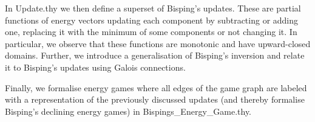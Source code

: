 In Update.thy we then define a superset of Bisping's updates. These are partial functions of energy vectors updating each component by subtracting or adding one, replacing it with the minimum of some components or not changing it. In particular, we observe that these functions are monotonic and have upward-closed domains.
Further, we introduce a generalisation of Bisping's inversion and relate it to Bisping's updates using Galois connections. 

Finally, we formalise energy games where all edges of the game graph are labeled with a representation of the previously discussed updates (and thereby formalise Bisping's declining energy games) in Bispings\_Energy\_Game.thy.
